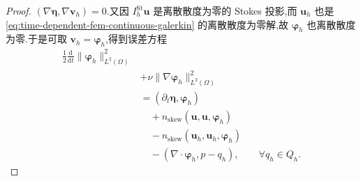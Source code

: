 \begin{theorem}
\begin{proof}
$(\nabla\symbf{\eta},\nabla\bm{v}_h)=0$.又因
$I_h^{\mathrm{St}}\bm{u}$ 是离散散度为零的 Stokes 投影,而
$\bm{u}_h$ 也是\cref{eq:time-dependent-fem-continuous-galerkin} 的离散散度为零解,故 $\symbf{\varphi}_h$ 也离散散度为零.于是可取 $\bm{v}_h=\symbf{\varphi}_h$,得到误差方程
\begin{equation}\label{eq:time-dependent-fem-error-energy-equation}
\begin{aligned}
  \frac{1}{2}\frac{\mathrm{d}}{\mathrm{d}t}
    \|\symbf{\varphi}_h\|_{L^2(\Omega)}^2\\
  &+\nu\|\nabla\symbf{\varphi}_h\|_{L^2(\Omega)}^2\\
  &= (\partial_t\symbf{\eta},\symbf{\varphi}_h)\\
  &\quad+n_{\mathrm{skew}}(\bm{u},\bm{u},\symbf{\varphi}_h)\\
  &\quad-n_{\mathrm{skew}}(\bm{u}_h,\bm{u}_h,\symbf{\varphi}_h)\\
  &\quad-(\nabla\cdot\symbf{\varphi}_h,p-q_h),
      \qquad\forall q_h\in Q_h.
\end{aligned}
\end{equation}


\end{proof}
\end{theorem}
